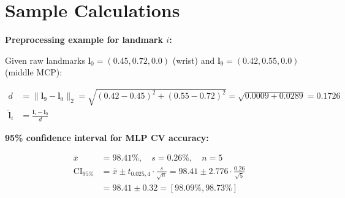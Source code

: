 \documentclass[11pt,a4paper]{article}
\begin{document}
\section{Sample Calculations}
\label{app:calculations}

\textbf{Preprocessing example for landmark $i$:}

Given raw landmarks $\mathbf{l}_0 = (0.45, 0.72, 0.0)$ (wrist) and $\mathbf{l}_9 = (0.42, 0.55, 0.0)$ (middle MCP):

\begin{align*}
    d &= \|\mathbf{l}_9 - \mathbf{l}_0\|_2 = \sqrt{(0.42 - 0.45)^2 + (0.55 - 0.72)^2} = \sqrt{0.0009 + 0.0289} = 0.1726 \\
    \hat{\mathbf{l}}_i &= \frac{\mathbf{l}_i - \mathbf{l}_0}{d}
\end{align*}

\textbf{95\% confidence interval for MLP CV accuracy:}

\begin{align*}
    \bar{x} &= 98.41\%, \quad s = 0.26\%, \quad n = 5 \\
    \text{CI}_{95\%} &= \bar{x} \pm t_{0.025, 4} \cdot \frac{s}{\sqrt{n}} = 98.41 \pm 2.776 \cdot \frac{0.26}{\sqrt{5}} \\
    &= 98.41 \pm 0.32 = [98.09\%, 98.73\%]
\end{align*}
\end{document}
